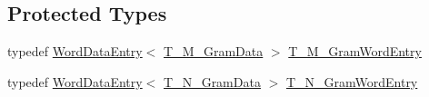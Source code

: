 \subsection*{Protected Types}
\begin{DoxyCompactItemize}
\item 
typedef \hyperlink{classuva_1_1smt_1_1tries_1_1_w2_c_array_trie_1_1_word_data_entry}{Word\+Data\+Entry}$<$ \hyperlink{namespaceuva_1_1smt_1_1tries_1_1_____w2_c_array_trie_ac6f1755aebdfdd6bde13d9e91d22337d}{T\+\_\+\+M\+\_\+\+Gram\+Data} $>$ \hyperlink{classuva_1_1smt_1_1tries_1_1_w2_c_array_trie_a50ce9441fbab98dd0b70544fc29fd4e0}{T\+\_\+\+M\+\_\+\+Gram\+Word\+Entry}
\item 
typedef \hyperlink{classuva_1_1smt_1_1tries_1_1_w2_c_array_trie_1_1_word_data_entry}{Word\+Data\+Entry}$<$ \hyperlink{namespaceuva_1_1smt_1_1tries_1_1_____w2_c_array_trie_ac05cbbe324aaedbe98213e21625e2774}{T\+\_\+\+N\+\_\+\+Gram\+Data} $>$ \hyperlink{classuva_1_1smt_1_1tries_1_1_w2_c_array_trie_aff6d64e68c487517e202ed5a802b6643}{T\+\_\+\+N\+\_\+\+Gram\+Word\+Entry}
\end{DoxyCompactItemize}
